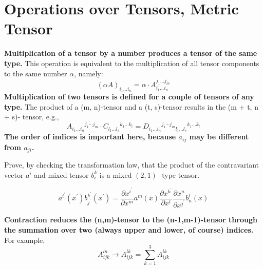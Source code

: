 \section{Operations over Tensors, Metric Tensor}
\textbf{Multiplication of a tensor by a number produces a tensor of the same type.} This operation is equivalent to the multiplication of all tensor components to the same number $\alpha$, namely:
\begin{equation}
(\alpha A)_{i_{1} \ldots i_{n}}=\alpha \cdot A_{i_{1} \ldots i_{n}}^{j_{1} \ldots j_{m}}
\end{equation}
\textbf{Multiplication of two tensors is defined for a couple of tensors of any type.} The product of a (m, n)-tensor and a (t, s)-tensor results in the (m + t, n + s)- tensor, e.g.,
\begin{equation}
A_{i_{1} \ldots i_{n}} {}^{j_1 \cdots j_{m}} \cdot C_{l_{1} \ldots l_{s}} {}^{k_1 \ldots k_{i}}=D_{i_{1} \ldots i_{n}} {}^{j_1 \cdots j_{m}} {}_{l_1 \ldots l_{s}}{}^{k_1 \ldots k_{l}}
\end{equation}
\textbf{The order of indices is important here, because $a_{i j}$ may be different from $a_{j i}$.}
\begin{example}
 Prove, by checking the transformation law, that the product of the contravariant vector $a^{i}$ and mixed tensor $b_{i}^{k}$ is a mixed $(2,1)$ -type tensor.
 
$$
a^{i^{\prime}}\left(x^{\prime}\right) b_{j^{\prime}}^{k^{\prime}}\left(x^{\prime}\right)=\frac{\partial x^{i^{\prime}}}{\partial x^{m}} a^{m}(x) \frac{\partial x^{k^{\prime}}}{\partial x^{l}} \frac{\partial x^{n}}{\partial x^{j^{\prime}}} b_{n}^{l}(x)
$$
\end{example}
\textbf{Contraction reduces the (n,m)-tensor to the (n-1,m-1)-tensor through the summation over two (always upper and lower, of course) indices.} For example,
\begin{equation}
A_{i j k}^{l n} \longrightarrow A_{i j k}^{l k}=\sum_{k=1}^{3} A_{i j k}^{l k}
\end{equation}

